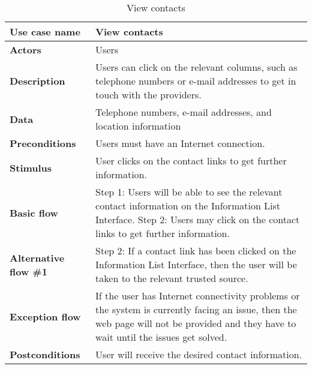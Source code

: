 \documentclass[listof=nochaptergap]{report}
\begin{document}
        \begin{table}[H]
        \centering
         \begin{tabular}{| p{4cm} | p{10cm} |} 
         \hline
         \textbf{Use case name} & View contacts \\
         \hline
         \textbf{Actors} & Users \\
         \hline
         \textbf{Description} & Users can click on the relevant columns, such as telephone numbers or e-mail addresses to get in touch with the providers.  \\
         \hline
         \textbf{Data} & Telephone numbers, e-mail addresses, and location information \\
         \hline
         \textbf{Preconditions} & Users must have an Internet connection. \\
         \hline
         \textbf{Stimulus} & User clicks on the contact links to get further information. \\
         \hline
         \textbf{Basic flow} & Step 1: Users will be able to see the relevant contact information on the Information List Interface.
         \newline Step 2: Users may click on the contact links to get further information. \\
         \hline
         \textbf{Alternative flow \#1} & Step 2: If a contact link has been clicked on the Information List Interface, then the user will be taken to the relevant trusted source. \\
         \hline
         \textbf{Exception flow} & If the user has Internet connectivity problems or the system is currently facing an issue, then the web page will not be provided and they have to wait until the issues get solved. \\
         \hline
         \textbf{Postconditions} & User will receive the desired contact information. \\
         \hline
         \end{tabular}
        \caption{View contacts}
        \label{tab:table16}
    \end{table}
\end{document}
